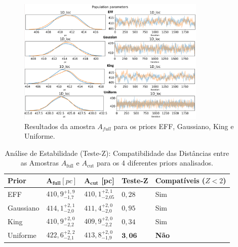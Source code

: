 \documentclass[12pt]{projeto}
\begin{document}
\begin{figure}[ht]
\centering
\includegraphics[width= 0.8\textwidth]{ngc1662_comparison.png}
\caption{\label{fig:ngc1662_comparison} Resultados da amostra \(A_{full}\) para os priors EFF, Gaussiano, King e Uniforme.}
\end{figure}

\begin{table}[h]
    \centering
    \caption{Análise de Estabilidade (Teste-Z): Compatibilidade das Distâncias entre as Amostras $A_{\text{full}}$ e $A_{\text{cut}}$ para os 4 diferentes priors analisados.}
    \label{tab:zscore_estabilidade_final}
    \renewcommand{\arraystretch}{1.5} %
    \begin{tabular}{|l|>{\centering}m{2.5cm}|>{\centering}m{2.5cm}|>{\centering}m{1.5cm}|>{\centering\arraybackslash}m{2.5cm}|}
        \hline
        \textbf{Prior} & $\mathbf{A_{\text{full}}} [pc]$ & $\mathbf{A_{\text{cut}}}$ [pc] & \textbf{Teste-Z} & \textbf{Compatíveis ($Z < 2$)} \\
        \hline
        EFF  & $410,9^{+1,9}_{-\text{1,7}}$ & $410,1^{+2,1}_{-\text{2,05}}$ & $0,28$ & Sim \\
        \hline
        Gaussiano & $414,1^{+2,1}_{-\text{2,0}}$ & $411,4^{+2,0}_{-\text{2,0}}$ & $0,95$ & Sim \\
        \hline
        King & $410,9^{+2,0}_{-\text{2,2}}$ & $409,9^{+2,0}_{-\text{2,2}}$ & $0,34$ & Sim \\
        \hline
        Uniforme & $422,6^{+2,2}_{-\text{2,1}}$ & $413,8^{+2,0}_{-\text{1,9}}$ & $\mathbf{3,06}$ & \textbf{Não} \\
        \hline
    \end{tabular}
    \renewcommand{\arraystretch}{1.0} %
\end{table}
\end{document}
